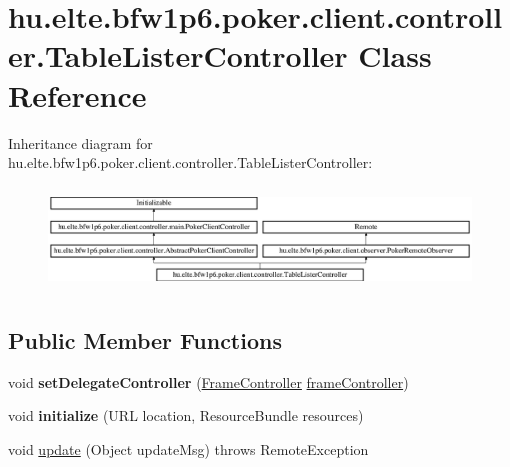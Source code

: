 \hypertarget{classhu_1_1elte_1_1bfw1p6_1_1poker_1_1client_1_1controller_1_1_table_lister_controller}{}\section{hu.\+elte.\+bfw1p6.\+poker.\+client.\+controller.\+Table\+Lister\+Controller Class Reference}
\label{classhu_1_1elte_1_1bfw1p6_1_1poker_1_1client_1_1controller_1_1_table_lister_controller}
Inheritance diagram for hu.\+elte.\+bfw1p6.\+poker.\+client.\+controller.\+Table\+Lister\+Controller\+:\begin{figure}[H]
\begin{center}
\leavevmode
\includegraphics[height=2.779156cm]{classhu_1_1elte_1_1bfw1p6_1_1poker_1_1client_1_1controller_1_1_table_lister_controller}
\end{center}
\end{figure}
\subsection*{Public Member Functions}
\begin{DoxyCompactItemize}
\item 
\hypertarget{classhu_1_1elte_1_1bfw1p6_1_1poker_1_1client_1_1controller_1_1_table_lister_controller_a6cc4a4fda940ae78c514152e0c5f9522}{}void {\bfseries set\+Delegate\+Controller} (\hyperlink{classhu_1_1elte_1_1bfw1p6_1_1poker_1_1client_1_1controller_1_1main_1_1_frame_controller}{Frame\+Controller} \hyperlink{classhu_1_1elte_1_1bfw1p6_1_1poker_1_1client_1_1controller_1_1_abstract_poker_client_controller_a747c3be2b66fbc23a69bfe6ebe3e4022}{frame\+Controller})\label{classhu_1_1elte_1_1bfw1p6_1_1poker_1_1client_1_1controller_1_1_table_lister_controller_a6cc4a4fda940ae78c514152e0c5f9522}

\item 
\hypertarget{classhu_1_1elte_1_1bfw1p6_1_1poker_1_1client_1_1controller_1_1_table_lister_controller_af586cc31ee36380644b621e1a4ff2461}{}void {\bfseries initialize} (U\+R\+L location, Resource\+Bundle resources)\label{classhu_1_1elte_1_1bfw1p6_1_1poker_1_1client_1_1controller_1_1_table_lister_controller_af586cc31ee36380644b621e1a4ff2461}

\item 
void \hyperlink{classhu_1_1elte_1_1bfw1p6_1_1poker_1_1client_1_1controller_1_1_table_lister_controller_a3ee83f9da9abcadb20d33e111ee0fada}{update} (Object update\+Msg)  throws Remote\+Exception 
\end{DoxyCompactItemize}
